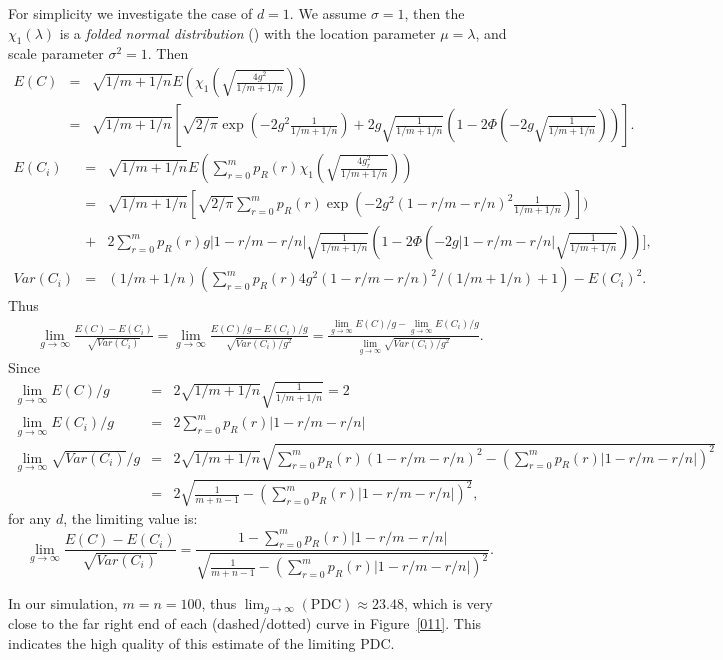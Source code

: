 \documentclass[12pt]{article}
\begin{document}
\begin{appendices}
For simplicity we investigate the case of $d=1$. We assume $\sigma=1$, then the $\chi_{1}(\lambda)$ is a \textit{folded normal distribution} (\citet{leone1961folded}) with the location parameter $\mu=\lambda$, and scale parameter $\sigma^2=1$.
Then 
\begin{eqnarray*}
E(C)&=&\sqrt{1/m+1/n}E(\chi_1(\sqrt{\frac{4g^2}{1/m+1/n}}))\\
&=&\sqrt{1/m+1/n}[\sqrt{2/\pi}\exp(-2g^2\frac{1}{1/m+1/n})+2g\sqrt{\frac{1}{1/m+1/n}}(1-2\Phi(-2g\sqrt{\frac{1}{1/m+1/n}}))].
\end{eqnarray*}
\begin{eqnarray*}
E(C_i)&=&\sqrt{1/m+1/n}E(\sum_{r=0}^m  p_R(r)\chi_1(\sqrt{\frac{4g_r^2}{1/m+1/n}}))\\
&=&\sqrt{1/m+1/n}[\sqrt{2/\pi}\sum_{r=0}^m p_R(r)\exp(-2g^2(1-r/m-r/n)^2\frac{1}{1/m+1/n})])\\
&+&2\sum_{r=0}^m  p_R(r) g|1-r/m-r/n| \sqrt{\frac{1}{1/m+1/n}}(1-2\Phi(-2g|1-r/m-r/n|\sqrt{\frac{1}{1/m+1/n}}))],\\
Var(C_i)&=&(1/m+1/n)(\sum_{r=0}^m  p_R(r) 4g^2(1-r/m-r/n)^2/(1/m+1/n)+1)-E(C_i)^2.
\end{eqnarray*}
Thus
\begin{eqnarray*}
\lim_{g\to \infty}\frac{E(C)-E(C_i)}{\sqrt{Var(C_i)}}=\lim_{g\to \infty}\frac{E(C)/g-E(C_i)/g}{\sqrt{Var(C_i)/g^2}}=\frac{\lim_{g\to \infty}E(C)/g-\lim_{g\to \infty}E(C_i)/g}{\lim_{g\to \infty}\sqrt{Var(C_i)/g^2}}.
\end{eqnarray*}
Since
\begin{eqnarray*}
\lim_{g\to \infty}E(C)/g&=&2\sqrt{1/m+1/n}\sqrt{\frac{1}{1/m+1/n}}=2\\
\lim_{g\to \infty}E(C_i)/g&=&2\sum_{r=0}^m  p_R(r)  |1-r/m-r/n|\\
\lim_{g\to \infty}\sqrt{Var(C_i)}/g&=&2\sqrt{1/m+1/n}\sqrt{\sum_{r=0}^m  p_R(r)  (1-r/m-r/n)^2-(\sum_{r=0}^m  p_R(r)  |1-r/m-r/n|)^2}\\
&=&2\sqrt{\frac{1}{m+n-1}-(\sum_{r=0}^m  p_R(r)  |1-r/m-r/n|)^2},
\end{eqnarray*}
for any $d$, the limiting value is:
\[
\lim_{g\to \infty}\frac{E(C)-E(C_i)}{\sqrt{Var(C_i)}}=\frac{1-\sum_{r=0}^m  p_R(r)  |1-r/m-r/n|}{\sqrt{\frac{1}{m+n-1}-(\sum_{r=0}^m  p_R(r)  |1-r/m-r/n|)^2}}.
\]

In our simulation, $m=n=100$, thus $\lim_{g\to \infty}(\text{PDC})\approx 23.48$, which is very close to the far right end of each (dashed/dotted) curve in Figure~\ref{011}. This indicates the high quality of this estimate of the limiting PDC.


\end{appendices}
\end{document}

